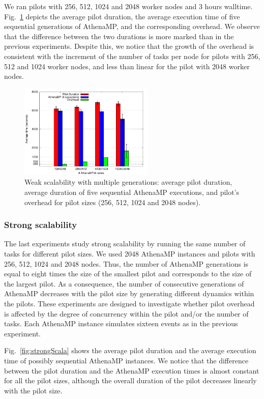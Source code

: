 We ran pilots with 256, 512, 1024 and 2048 worker nodes and 3 hours
walltime. Fig.~\ref{fig:weakScal2a} depicts the average pilot duration, the
average execution time of five sequential generations of AthenaMP, and the
corresponding overhead. We observe that the difference between the two durations
is more marked than in the previous experiments. Despite this, we notice that
the growth of the overhead is consistent with the increment of the number of
tasks per node for pilots with 256, 512 and 1024 worker nodes, and less than
linear for the pilot with 2048 worker nodes.

\begin{figure}[!htb]
        \includegraphics[height=4.5cm,width=\columnwidth]{./figures/NGE/weak2.pdf}
    \caption{Weak scalability with multiple generations: average pilot
    duration, average duration of five sequential AthenaMP executions, and
    pilot's overhead for pilot sizes (256, 512, 1024 and 2048 nodes).}
\label{fig:weakScal2a}
\end{figure}

\subsubsection{Strong scalability}

The last experiments  study strong scalability by running the same number of
tasks for different pilot sizes. We used 2048 AthenaMP instances and  pilots
with 256, 512, 1024 and 2048 nodes. Thus, the number of AthenaMP generations is
equal to eight times the size of the smallest pilot and corresponds to the size
of the largest pilot. As a consequence, the number of consecutive generations of
AthenaMP decreases with the pilot size by generating different dynamics within
the pilots. These experiments are designed to investigate whether pilot overhead
is affected by the degree of concurrency within the pilot and/or the number of
tasks. Each AthenaMP instance simulates sixteen events as in the previous
experiment.

Fig.~\ref{fig:strongScala}  shows the average pilot duration and the average
execution time of possibly sequential AthenaMP instances.  We  notice that the
difference between the pilot duration and the AthenaMP execution times is almost
constant for all the pilot sizes, although the overall duration of the pilot
decreases linearly with the pilot size.

